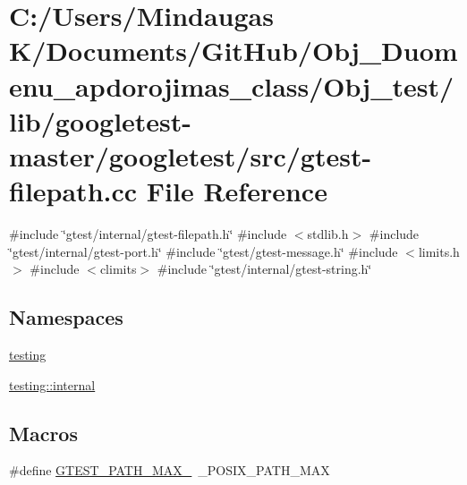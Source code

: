 \hypertarget{_obj__test_2lib_2googletest-master_2googletest_2src_2gtest-filepath_8cc}{}\section{C\+:/\+Users/\+Mindaugas K/\+Documents/\+Git\+Hub/\+Obj\+\_\+\+Duomenu\+\_\+apdorojimas\+\_\+class/\+Obj\+\_\+test/lib/googletest-\/master/googletest/src/gtest-\/filepath.cc File Reference}
\label{_obj__test_2lib_2googletest-master_2googletest_2src_2gtest-filepath_8cc}
{\ttfamily \#include \char`\"{}gtest/internal/gtest-\/filepath.\+h\char`\"{}}\newline
{\ttfamily \#include $<$stdlib.\+h$>$}\newline
{\ttfamily \#include \char`\"{}gtest/internal/gtest-\/port.\+h\char`\"{}}\newline
{\ttfamily \#include \char`\"{}gtest/gtest-\/message.\+h\char`\"{}}\newline
{\ttfamily \#include $<$limits.\+h$>$}\newline
{\ttfamily \#include $<$climits$>$}\newline
{\ttfamily \#include \char`\"{}gtest/internal/gtest-\/string.\+h\char`\"{}}\newline
\subsection*{Namespaces}
\begin{DoxyCompactItemize}
\item 
 \mbox{\hyperlink{namespacetesting}{testing}}
\item 
 \mbox{\hyperlink{namespacetesting_1_1internal}{testing\+::internal}}
\end{DoxyCompactItemize}
\subsection*{Macros}
\begin{DoxyCompactItemize}
\item 
\#define \mbox{\hyperlink{_obj__test_2lib_2googletest-master_2googletest_2src_2gtest-filepath_8cc_ad9d445747785a9271a57cf1d392b89ad}{G\+T\+E\+S\+T\+\_\+\+P\+A\+T\+H\+\_\+\+M\+A\+X\+\_\+}}~\+\_\+\+P\+O\+S\+I\+X\+\_\+\+P\+A\+T\+H\+\_\+\+M\+AX
\end{DoxyCompactItemize}


